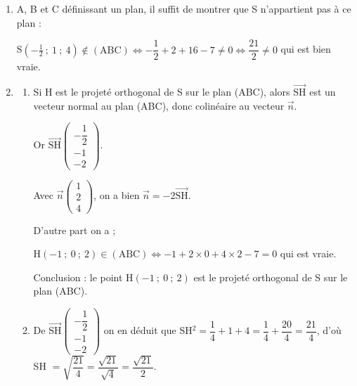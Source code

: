 \documentclass[10pt]{article}
\providecommand{\R}{\mathbb{R}}
\providecommand{\vect}[1]{\overrightarrow{#1}}
\begin{document}
\begin{enumerate}
\begin{enumerate}
Ces deux vecteurs ne sont pas colinéaires : leurs premières coordonnées sont égales mais pas les autres

Or $\vect{n} \cdot \vect{\text{AB}} = 2 - 6 + 4 = 0$ et $\vect{n} \cdot \vect{\text{AC}} = 2 - 2 + 0 = 0$.

Conclusion $\vect{n}$ orthogonal à deux vecteurs non colinéaires du plan (ABC) est un vecteur normal à ce plan.
	\item Le résultat précédent montre que :
	
$M(x~;~y~;~z) in (\text{ABC}) \iff 1x + 2y + 4z + d = 0, \: d \in \R$.

En particulier C$(1~;~1~;~1) in (\text{ABC}) \iff 1 + 2 + 4 + d = 0, \: d \in \R \iff  d = - 7$.

Finalement : $M(x~;~y~;~z) in (\text{ABC}) \iff x + 2y + 4z - 7 = 0$.
	\end{enumerate}
\item A, B et C définissant un plan, il suffit de montrer que S n'appartient pas à ce plan :

S$\left(- \frac 12~;~1~;~4\right) \notin (\text{ABC}) \iff - \dfrac 12  + 2 + 16 - 7 \ne 0 \iff \dfrac{21}{2} \ne 0$ qui est bien vraie.
\item 
	\begin{enumerate}
		\item Si H est le projeté orthogonal de S sur le plan (ABC), alors $\vect{\text{SH}}$ est un vecteur normal au plan (ABC), donc colinéaire au vecteur $\vect{n}$.
		
Or $\vect{\text{SH}}\begin{pmatrix}- \dfrac 12\\- 1\\-2\end{pmatrix}$.

Avec $\vect{n}\begin{pmatrix} 1\\2\\4\end{pmatrix}$, on a bien $\vect{n} = - 2\vect{\text{SH}}$.

D'autre part on a ;

H$(-1~;~0~;~2) \in (\text{ABC}) \iff - 1 + 2\times 0  + 4 \times 2 - 7 = 0$ qui est vraie.

Conclusion : le point H$(-1~;~0~;~2)$ est le projeté orthogonal de S sur le plan (ABC).
	\item De $\vect{\text{SH}}\begin{pmatrix}- \dfrac 12\\- 1\\-2\end{pmatrix}$ on en déduit que SH$^2 = \dfrac 14 + 1 + 4 = \dfrac 14 + \dfrac{20}{4} = \dfrac{21}{4}$, d'où SH $ = \sqrt{\dfrac{21}{4}} = \dfrac{\sqrt{21}}{\sqrt{4}} = \dfrac{\sqrt{21}}{2}$.
	

\end{enumerate}
\end{enumerate}
\end{document}
